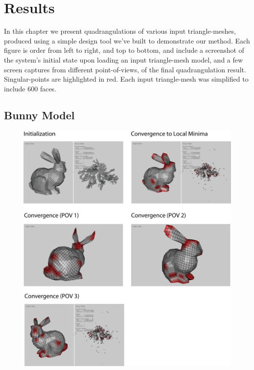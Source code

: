 \chapter{Results}
\label{chapter:results}
In this chapter we present quadrangulations of various input triangle-meshes, produced using a simple design tool we've built to demonstrate our method. Each figure is order from left to right, and top to bottom, and include a screenshot of the system's initial state upon loading an input triangle-mesh model, and a few screen captures from different point-of-views, of the final quadrangulation result. Singular-points are highlighted in red. Each input triangle-mesh was simplified to include 600 faces.
\newpage
\section{Bunny Model}
\begin{figure}[ht]
\centering
\includegraphics[width=14cm]{figures/results/bunny.png}
\caption[Bunny Model]{}
\end{figure}
\newpage
